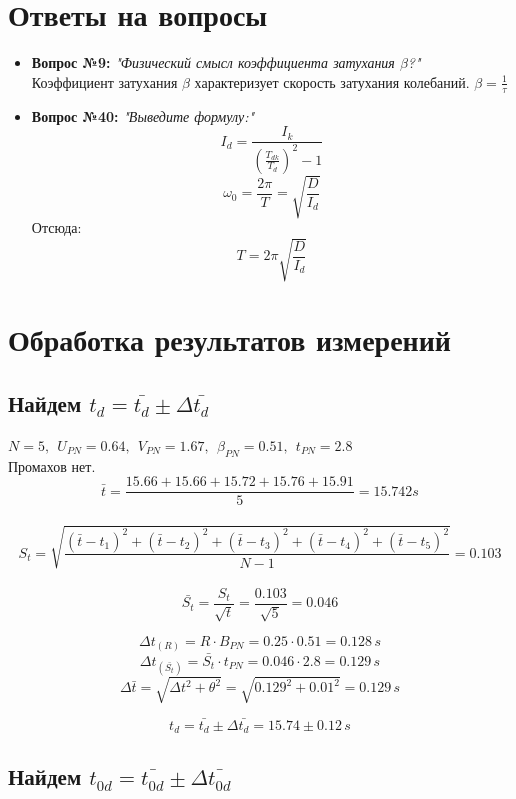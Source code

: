 \documentclass[a4paper,12pt]{report}
\begin{document}
\newpage
\section*{Ответы на вопросы}

\begin{itemize}
    \item \textbf{Вопрос №9:}
    	\textit{"Физический смысл коэффициента затухания $\beta$?"} \\
        Коэффициент затухания $\beta$ характеризует скорость затухания колебаний. $\beta = \frac{1}{\tau}$
    \item \textbf{Вопрос №40:}
        \textit{"Выведите формулу:"}
         \[ I_d = \frac{I_k}{(\frac{T_{dk}}{T_d})^2-1} \]
         \[ \omega_0 = \frac{2\pi}{T} = \sqrt{\frac{D}{I_{d}}} \]
         Отсюда:
         \[ T = 2\pi\sqrt{\frac{D}{I_d}} \]

\end{itemize}


\newpage

\section*{Обработка результатов измерений}

\subsection*{Найдем $t_d = \bar{t_d} \pm \Delta \bar{t_d}$}

$N=5,\ \ U_{PN}=0.64,\ \ V_{PN}=1.67,\ \ \beta_{PN}=0.51,\ \ t_{PN}=2.8$\\
Промахов нет.\\
\[\bar{t}= \frac{15.66+15.66+15.72+15.76+15.91}{5} =15.742 s\] \\
\[S_{t}=\sqrt{\frac{(\bar{t}-{t}_1)^2+(\bar{t}-{t}_2)^2+(\bar{t}-{t}_3)^2+(\bar{t}-{t}_4)^2+(\bar{t}-{t}_5)^2}{N-1}} = 0.103\]\\

\[\bar{S_{t}}=\frac{S_{t}}{\sqrt{t}}=\frac{0.103}{\sqrt{5}}=0.046\]

\[\Delta{t}_{(R)}=R\cdot B_{PN}=0.25\cdot 0.51=0.128 \, s\]
\[\Delta{t}_{(\bar{S_{t}})}=\bar{S_t}\cdot t_{PN}=0.046\cdot 2.8=0.129 \, s\]
\[\Delta{\bar{t}}=\sqrt{\Delta t^2 + \theta^2}=\sqrt{0.129^2 + 0.01^2}=0.129 \, s\]

\[{t_d}=\bar{t_d}\pm \Delta{\bar{t_d}}=15.74\pm 0.12 \, s\]

\subsection*{Найдем $t_{0d} = \bar{t_{0d}} \pm \Delta \bar{t_{0d}}$}
\end{document}
